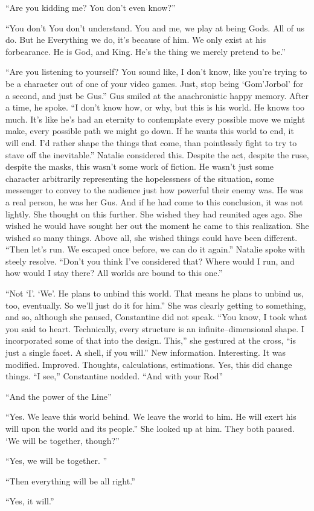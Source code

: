 “Are you kidding me? You don’t even know?”

“You don’t{\el} You don’t understand. You and me, we play at being Gods. All of us do. But he{\el} Everything we do, it’s because of him. We only exist at his forbearance. He is God, and King. He’s the thing we merely pretend to be.”

“Are you listening to yourself? You sound like, I don’t know, like you’re trying to be a character out of one of your video games. Just, stop being ‘Gom’Jorbol’ for a second, and just be Gus.”
\SmallVSpace
Gus smiled at the anachronistic happy memory. After a time, he spoke. “I don’t know how, or why, but this is his world. He knows too much. It’s like he’s had an eternity to contemplate every possible move we might make, every possible path we might go down. If he wants this world to end, it will end. I’d rather shape the things that come, than pointlessly fight to try to stave off the inevitable.”
\SmallVSpace
Natalie considered this. Despite the act, despite the ruse, despite the masks, this wasn’t some work of fiction. He wasn’t just some character arbitrarily representing the hopelessness of the situation, some messenger to convey to the audience just how powerful their enemy was. He was a real person, he was her Gus. And if he had come to this conclusion, it was not lightly.
\newpage
She thought on this further. She wished they had reunited ages ago. She wished he would have sought her out the moment he came to this realization. She wished so many things. Above all, she wished things could have been different.
\SmallVSpace
“Then let’s run. We escaped once before, we can do it again.” Natalie spoke with steely resolve.
\SmallVSpace
“Don’t you think I’ve considered that? Where would I run, and how would I stay there? All worlds are bound to this one.”

“Not ‘I’. ‘We’. He plans to unbind this world. That means he plans to unbind us, too, eventually. So we’ll just do it for him.” She was clearly getting to something, and so, although she paused, Constantine did not speak. “You know, I took what you said to heart. Technically, every structure is an infinite\mbox{--}dimensional shape. I incorporated some of that into the design. This,” she gestured at the cross, “is just a single facet. A shell, if you will.”
\SmallVSpace
New information. Interesting. It was modified. Improved. Thoughts, calculations, estimations. Yes, this did change things. “I see,” Constantine nodded.
\SmallVSpace
“And with your Rod{\el}”

“And the power of the Line{\el}”

“Yes. We leave this world behind. We leave the world to him. He will exert his will upon the world and its people.” She looked up at him. They both paused.
\SomeVSpace
‘We will be together, though?”

“Yes, we will be together. ”

“Then everything will be all right.”

“Yes, it will.”
